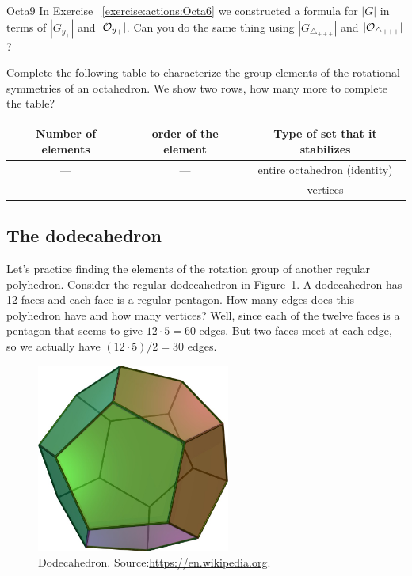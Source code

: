 \begin {exercise}{Octa9}
In Exercise ~\ref {exercise:actions:Octa6} we constructed a formula for $|G|$ in terms of $|G_{y_+}|$ and $|{\cal O}_{y_+}|$.  Can you do the same thing using $|G_{\triangle_{+ + +}}|$ and $|{\cal O}_{\triangle_{+ + +}}|$?
\end{exercise}

\begin{exercise}\label{exercise:actions:Octa10}
Complete the following table to characterize the group elements of the rotational symmetries of an octahedron.  We show two rows, how many more to complete the table? 
 
\begin{tabular}{ |c| c | c |} \hline
  Number of elements & order of the element & Type of set that it stabilizes \\ \hline
  ---&  ---& entire  octahedron (identity) \\ \hline
  --- & ---&  vertices \\
\end{tabular}
\end{exercise}
\subsection{The dodecahedron}
Let's practice finding the elements of the rotation group of another regular polyhedron.  Consider the regular dodecahedron in Figure~\ref{fig:Dodeca}.  A dodecahedron has 12 faces and each face is a regular pentagon.  How many edges does this polyhedron have and how many vertices?  Well, since each of the twelve faces is a pentagon that seems to give $12\cdot 5=60$ edges.  But two faces meet at each edge, so we actually have $(12\cdot 5)/2=30$ edges.

\begin{figure}[ht]
\begin{center}
\includegraphics[width=2.5in]{images/Dodecahedron.png}
\caption{Dodecahedron. Source:\url{https://en.wikipedia.org}.}
\label{fig:Dodeca}
\end{center}
\end{figure}

